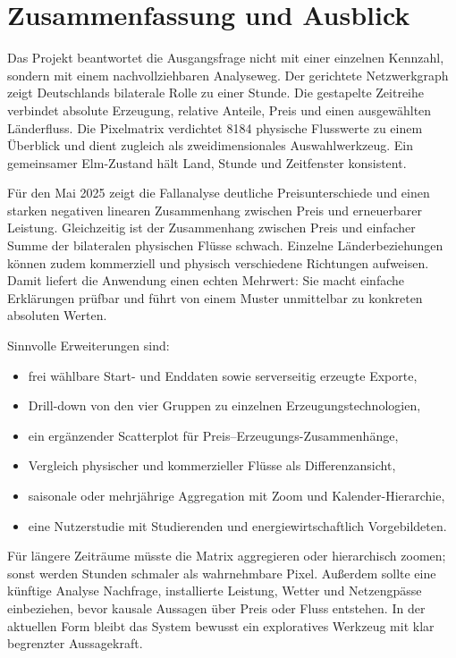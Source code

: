 \section{Zusammenfassung und Ausblick}
\label{sec:fazit}

Das Projekt beantwortet die Ausgangsfrage nicht mit einer einzelnen Kennzahl,
sondern mit einem nachvollziehbaren Analyseweg. Der gerichtete Netzwerkgraph
zeigt Deutschlands bilaterale Rolle zu einer Stunde. Die gestapelte Zeitreihe
verbindet absolute Erzeugung, relative Anteile, Preis und einen ausgewählten
Länderfluss. Die Pixelmatrix verdichtet 8184 physische Flusswerte zu einem
Überblick und dient zugleich als zweidimensionales Auswahlwerkzeug. Ein
gemeinsamer Elm-Zustand hält Land, Stunde und Zeitfenster konsistent.

Für den Mai 2025 zeigt die Fallanalyse deutliche Preisunterschiede und einen
starken negativen linearen Zusammenhang zwischen Preis und erneuerbarer
Leistung. Gleichzeitig ist der Zusammenhang zwischen Preis und einfacher Summe
der bilateralen physischen Flüsse schwach. Einzelne Länderbeziehungen können
zudem kommerziell und physisch verschiedene Richtungen aufweisen. Damit liefert
die Anwendung einen echten Mehrwert: Sie macht einfache Erklärungen prüfbar und
führt von einem Muster unmittelbar zu konkreten absoluten Werten.

Sinnvolle Erweiterungen sind:

\begin{itemize}
  \item frei wählbare Start- und Enddaten sowie serverseitig erzeugte Exporte,
  \item Drill-down von den vier Gruppen zu einzelnen Erzeugungstechnologien,
  \item ein ergänzender Scatterplot für Preis--Erzeugungs-Zusammenhänge,
  \item Vergleich physischer und kommerzieller Flüsse als Differenzansicht,
  \item saisonale oder mehrjährige Aggregation mit Zoom und
        Kalender-Hierarchie,
  \item eine Nutzerstudie mit Studierenden und energiewirtschaftlich
        Vorgebildeten.
\end{itemize}

Für längere Zeiträume müsste die Matrix aggregieren oder hierarchisch zoomen;
sonst werden Stunden schmaler als wahrnehmbare Pixel. Au{\ss}erdem sollte eine
künftige Analyse Nachfrage, installierte Leistung, Wetter und Netzengpässe
einbeziehen, bevor kausale Aussagen über Preis oder Fluss entstehen. In der
aktuellen Form bleibt das System bewusst ein exploratives Werkzeug mit klar
begrenzter Aussagekraft.

